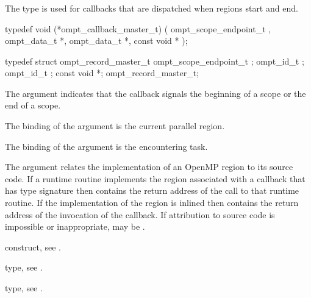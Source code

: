\subsubsection{}
\label{sec:ompt_callback_master_t}

\summary
The  type is used for callbacks that are 
dispatched when  regions start and end.

\format
\begin{ccppspecific}
\begin{omptCallback}
typedef void (*ompt_callback_master_t) (
  ompt_scope_endpoint_t ,
  ompt_data_t *,
  ompt_data_t *,
  const void *
);
\end{omptCallback}
\end{ccppspecific}

\record
\begin{ccppspecific}
\begin{omptRecord}
typedef struct ompt_record_master_t {
  ompt_scope_endpoint_t ;
  ompt_id_t ;
  ompt_id_t ;
  const void *;
} ompt_record_master_t;
\end{omptRecord}
\end{ccppspecific}

\argdesc
The  argument indicates that the callback signals
the beginning of a scope or the end of a scope.

The binding of the  argument is the current parallel region.

The binding of the  argument is the encountering task.

The  argument relates the implementation of an OpenMP region
to its source code. If a runtime routine implements the region associated with
a callback that has type signature  then
 contains the return address of the call to that runtime routine.
If the implementation of the region is inlined then  contains the
return address of the invocation of the callback. If attribution to source code
is impossible or inappropriate,  may be .

\begin{crossrefs}
\item {} construct, see .

\item {} type, see .

\item {} type, see .
\end{crossrefs}




